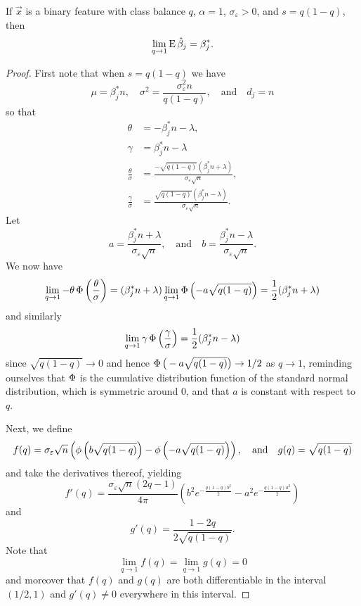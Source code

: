 \begin{theorem}
  \label{thm:binary-varscale-bias}
  If \(\vec{x}\) is a binary feature with class balance \(q\), \(\alpha = 1\), \(\sigma_\varepsilon > 0\), and \(s = q(1-q)\), then
  \[
    \lim_{q \rightarrow 1} \operatorname{E} \hat{\beta}_j = \beta^*_j.
  \]
\end{theorem}
\begin{proof}
  First note that when \(s = q(1-q)\) we have
  \[
    \mu = \beta_j^* n, \quad \sigma^2 = \frac{\sigma_\varepsilon^2 n}{q(1-q)}, \quad\text{and}\quad d_j = n
  \]
  so that
  \[
    \begin{aligned}
      \theta                & = -\beta_j^* n - \lambda,                                                    \\
      \gamma                & = \beta_j^* n - \lambda                                                      \\
      \frac{\theta}{\sigma} & = \frac{-\sqrt{q(1-q)}(\beta_j^* n + \lambda)}{\sigma_\varepsilon \sqrt{n}}, \\
      \frac{\gamma}{\sigma} & = \frac{\sqrt{q(1-q)}(\beta_j^*n - \lambda)}{\sigma_\varepsilon \sqrt{n}}.
    \end{aligned}
  \]
  Let
  \[
    a = \frac{\beta_j^* n + \lambda}{\sigma_\varepsilon \sqrt{n}}, \quad\text{and}\quad b = \frac{\beta_j^* n - \lambda}{\sigma_\varepsilon \sqrt{n}}.
  \]
  We now have
  \[
    \lim_{q \rightarrow 1} -\theta \operatorname{\Phi}\left(\frac{\theta}{\sigma}\right) = (\beta_j^*n + \lambda) \lim_{q \rightarrow 1} \operatorname{\Phi}\left(-a\sqrt{q(1-q)}\right) = \frac{1}{2}(\beta_j^*n + \lambda)
  \]
  and similarly
  \[
    \lim_{q \rightarrow 1} \gamma \operatorname{\Phi}\left(\frac{\gamma}{\sigma}\right) = \frac{1}{2}(\beta_j^*n - \lambda)
  \]
  since \(\sqrt{q(1-q)} \rightarrow 0\) and hence \(\operatorname{\Phi}\big(-a\sqrt{q(1-q)}\big) \rightarrow 1/2\) as \(q \rightarrow 1\), reminding ourselves
  that \(\operatorname{\Phi}\) is the cumulative distribution function of the standard normal distribution, which is symmetric around 0, and that \(a\) is constant with respect to \(q\).

  Next, we define
  \[
    f(q) = \sigma_\varepsilon \sqrt{n}\left(\operatorname{\phi}\left(b\sqrt{q(1-q)}\right) - \operatorname{\phi}\left(-a\sqrt{q(1-q)}\right)\right),\quad\text{and}\quad g(q) = \sqrt{q(1-q)}
  \]
  and take the derivatives thereof, yielding
  \[
    f'(q) = \frac{\sigma_\varepsilon \sqrt{n} (2q -1)}{4 \pi}\left(b^2 e^{-\frac{q(1-q)b^2}{2}}- a^2 e^{-\frac{q(1-q)a^2}{2}}\right)
  \]
  and
  \[
    g'(q) = \frac{1 - 2q}{2\sqrt{q(1-q)}}.
  \]
  Note that
  \[
    \lim_{q \rightarrow 1} f(q) = \lim_{q \rightarrow 1} g(q) = 0
  \]
  and moreover that \(f(q)\) and \(g(q)\) are both differentiable in the interval \((1/2, 1)\) and \(g'(q) \neq 0\) everywhere in this interval.


\end{proof}
